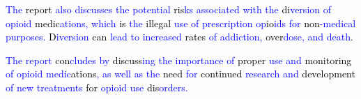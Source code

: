 \begin{tcolorbox}
  \textcolor{blue}{The} \textcolor{black}{report} \textcolor{blue}{also} \textcolor{blue}{discuss}\textcolor{blue}{es} \textcolor{blue}{the} \textcolor{blue}{potential} \textcolor{black}{ris}\textcolor{blue}{ks} \textcolor{blue}{associated} \textcolor{blue}{with} \textcolor{blue}{the} \textcolor{black}{di}\textcolor{blue}{version} \textcolor{blue}{of} \textcolor{blue}{op}\textcolor{blue}{io}\textcolor{blue}{id} \textcolor{black}{medic}\textcolor{blue}{ations}\textcolor{blue}{,} \textcolor{blue}{which} \textcolor{black}{is} \textcolor{blue}{the} \textcolor{black}{illegal} \textcolor{blue}{use} \textcolor{blue}{of} \textcolor{blue}{pres}\textcolor{blue}{cription} \textcolor{blue}{op}\textcolor{black}{io}\textcolor{blue}{ids} \textcolor{blue}{for} \textcolor{black}{non}\textcolor{blue}{-}\textcolor{blue}{med}\textcolor{blue}{ical} \textcolor{blue}{purposes}\textcolor{blue}{.} \textcolor{black}{D}\textcolor{blue}{ivers}\textcolor{blue}{ion} \textcolor{black}{can} \textcolor{blue}{lead} \textcolor{blue}{to} \textcolor{blue}{increased} \textcolor{black}{rates} \textcolor{blue}{of} \textcolor{blue}{add}\textcolor{blue}{iction}\textcolor{blue}{,} \textcolor{black}{over}\textcolor{blue}{d}\textcolor{blue}{ose}\textcolor{blue}{,} \textcolor{blue}{and} \textcolor{blue}{death}\textcolor{black}{.}
  
  \textcolor{blue}{The} \textcolor{blue}{report} \textcolor{black}{con}\textcolor{blue}{cludes} \textcolor{blue}{by} \textcolor{black}{discuss}\textcolor{blue}{ing} \textcolor{blue}{the} \textcolor{blue}{importance} \textcolor{blue}{of} \textcolor{black}{proper} \textcolor{blue}{use} \textcolor{blue}{and} \textcolor{black}{monitoring} \textcolor{blue}{of} \textcolor{blue}{op}\textcolor{blue}{io}\textcolor{blue}{id} \textcolor{blue}{medic}\textcolor{black}{ations}\textcolor{blue}{,} \textcolor{blue}{as} \textcolor{blue}{well} \textcolor{blue}{as} \textcolor{blue}{the} \textcolor{black}{need} \textcolor{blue}{for} \textcolor{black}{continued} \textcolor{blue}{research} \textcolor{blue}{and} \textcolor{black}{development} \textcolor{blue}{of} \textcolor{blue}{new} \textcolor{blue}{treat}\textcolor{blue}{ments} \textcolor{black}{for} \textcolor{blue}{op}\textcolor{blue}{io}\textcolor{blue}{id} \textcolor{blue}{use} \textcolor{black}{dis}\textcolor{blue}{orders}\textcolor{blue}{.}
\end{tcolorbox}

